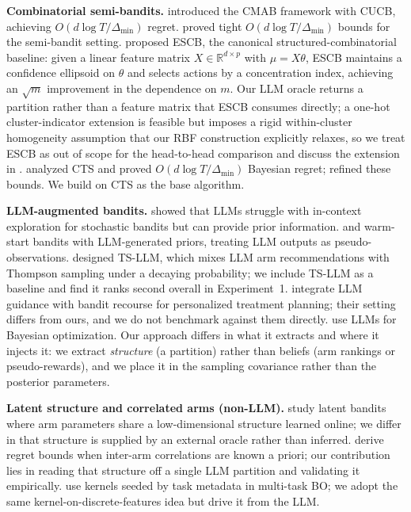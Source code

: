 \documentclass{article}
\theoremstyle{plain}
\theoremstyle{definition}
\theoremstyle{remark}
\newcommand{\R}{\mathbb{R}}
\newcommand{\gap}{\Delta_{\min}}
\begin{document}
\textbf{Combinatorial semi-bandits.}
\citet{chen2013cucb} introduced the CMAB framework with CUCB, achieving $O(d \log T / \gap)$ regret.
\citet{kveton2015tight} proved tight $O(d \log T / \gap)$ bounds for the semi-bandit setting.
\citet{combes2015combinatorial} proposed ESCB, the canonical structured-combinatorial baseline: given a linear feature matrix $X \in \R^{d \times p}$ with $\mu = X\theta$, ESCB maintains a confidence ellipsoid on $\theta$ and selects actions by a concentration index, achieving an $\sqrt{m}$ improvement in the dependence on $m$.
Our LLM oracle returns a partition rather than a feature matrix that ESCB consumes directly; a one-hot cluster-indicator extension is feasible but imposes a rigid within-cluster homogeneity assumption that our RBF construction explicitly relaxes, so we treat ESCB as out of scope for the head-to-head comparison and discuss the extension in .
\citet{wang2018cts} analyzed CTS and proved $O(d \log T / \gap)$ Bayesian regret; \citet{perrault2020statistical} refined these bounds.
We build on CTS as the base algorithm.

\textbf{LLM-augmented bandits.}
\citet{krishnamurthy2024canllms} showed that LLMs struggle with in-context exploration for stochastic bandits but can provide prior information.
\citet{alamdari2024jumpstarting} and \citet{bayley2025jumpstart} warm-start bandits with LLM-generated priors, treating LLM outputs as pseudo-observations.
\citet{sun2025tsllm} designed TS-LLM, which mixes LLM arm recommendations with Thompson sampling under a decaying probability; we include TS-LLM as a baseline and find it ranks second overall in Experiment~1.
\citet{cao2026libra} integrate LLM guidance with bandit recourse for personalized treatment planning; their setting differs from ours, and we do not benchmark against them directly.
\citet{liu2024llambo} use LLMs for Bayesian optimization.
Our approach differs in what it extracts and where it injects it: we extract \emph{structure} (a partition) rather than beliefs (arm rankings or pseudo-rewards), and we place it in the sampling covariance rather than the posterior parameters.

\textbf{Latent structure and correlated arms (non-LLM).}
\citet{hong2020latent} study latent bandits where arm parameters share a low-dimensional structure learned online; we differ in that structure is supplied by an external oracle rather than inferred.
\citet{gupta2021correlated} derive regret bounds when inter-arm correlations are known a priori; our contribution lies in reading that structure off a single LLM partition and validating it empirically.
\citet{swersky2013multitask} use kernels seeded by task metadata in multi-task BO; we adopt the same kernel-on-discrete-features idea but drive it from the LLM.
\end{document}
